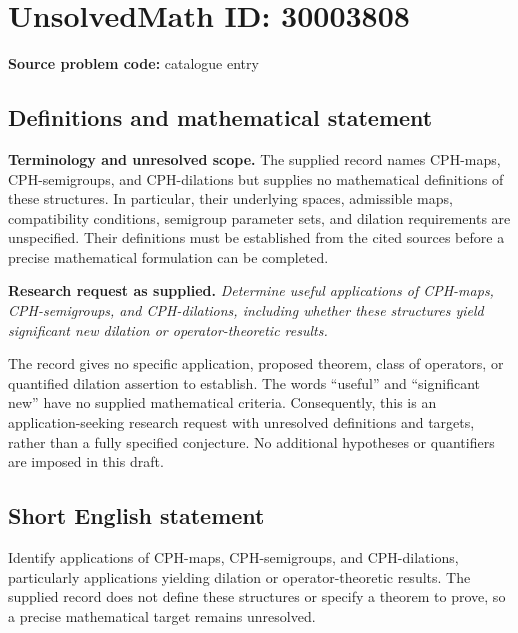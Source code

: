 \documentclass[11pt]{article}
\begin{document}
\section*{UnsolvedMath ID: 30003808}
\textbf{Source problem code:} catalogue entry
\subsection{Definitions and mathematical statement}
\textbf{Terminology and unresolved scope.} The supplied record names CPH-maps, CPH-semigroups, and CPH-dilations but supplies no mathematical definitions of these structures. In particular, their underlying spaces, admissible maps, compatibility conditions, semigroup parameter sets, and dilation requirements are unspecified. Their definitions must be established from the cited sources before a precise mathematical formulation can be completed.

\textbf{Research request as supplied.} \emph{Determine useful applications of CPH-maps, CPH-semigroups, and CPH-dilations, including whether these structures yield significant new dilation or operator-theoretic results.}

The record gives no specific application, proposed theorem, class of operators, or quantified dilation assertion to establish. The words ``useful'' and ``significant new'' have no supplied mathematical criteria. Consequently, this is an application-seeking research request with unresolved definitions and targets, rather than a fully specified conjecture. No additional hypotheses or quantifiers are imposed in this draft.
\subsection{Short English statement}
Identify applications of CPH-maps, CPH-semigroups, and CPH-dilations, particularly applications yielding dilation or operator-theoretic results. The supplied record does not define these structures or specify a theorem to prove, so a precise mathematical target remains unresolved.
\end{document}

